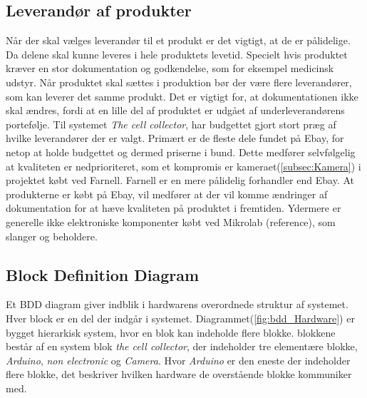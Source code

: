 \subsection{Leverandør af produkter}
Når der skal vælges leverandør til et produkt er det vigtigt, at de er pålidelige. Da delene skal kunne leveres i hele produktets levetid. Specielt hvis produktet kræver en stor dokumentation og godkendelse, som for eksempel medicinsk udstyr. Når produktet skal sættes i produktion bør der være flere leverandører, som kan leverer det samme produkt. Det er vigtigt for, at dokumentationen ikke skal ændres, fordi at en lille del af produktet er udgået af underleverandørens portefølje.
Til systemet \textit{The cell collector}, har budgettet gjort stort præg af hvilke leverandører der er valgt. Primært er de fleste dele fundet på Ebay, for netop at holde budgettet og dermed priserne i bund. Dette medfører selvfølgelig at kvaliteten er nedprioriteret, som et kompromis er kameraet(\ref{subsec:Kamera}) i projektet købt ved Farnell. Farnell er en mere pålidelig forhandler end Ebay. At produkterne er købt på Ebay, vil medfører at der vil komme ændringer af dokumentation for  at hæve kvaliteten på produktet i fremtiden. Ydermere er generelle ikke elektroniske komponenter købt ved Mikrolab  (reference), som slanger og beholdere. 

     


 
 
 
 
 \newpage
\subsection{Block Definition Diagram}  \label{sub:bdd_hardware}
Et BDD diagram giver indblik i hardwarens overordnede struktur af systemet. Hver block er en del der indgår i systemet. Diagrammet(\ref{fig:bdd_Hardware}) er bygget hierarkisk system, hvor en blok kan indeholde flere blokke. blokkene består af en system blok \textit{the cell collector}, der indeholder tre elementære blokke, \textit{Arduino}, \textit{non electronic} og \textit{Camera}. Hvor \textit{Arduino} er den eneste der indeholder flere blokke, det beskriver hvilken hardware de overstående blokke kommuniker med.


